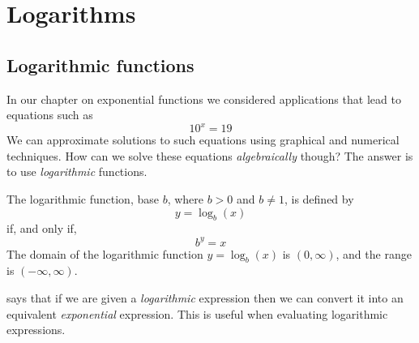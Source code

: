 %
%
\chapter{Logarithms}
\minitoc
\section{Logarithmic functions}
In our chapter on exponential functions we considered applications that 
lead to equations such as
\[
	10^x=19
\]
We can approximate solutions to such equations using graphical and 
numerical techniques. How can we solve these equations \emph{algebraically} 
though? The answer is to use \emph{logarithmic} functions.

\begin{pccdefinition}\label{log:def:logfunctions}
	The logarithmic function, base $b$, where $b>0$ and $b\ne 1$, is 
	defined by
	\[
		y=\log_b(x)
	\]
	if, and only if, 
	\[
		b^y=x
	\]
	The domain of the logarithmic function $y=\log_b(x)$ is $(0,\infty)$, and 
	the range is $(-\infty,\infty)$.
\end{pccdefinition}

 says that if we are given a \emph{logarithmic} 
expression then we can convert it into an equivalent \emph{exponential} 
expression. This is useful when evaluating logarithmic expressions.

